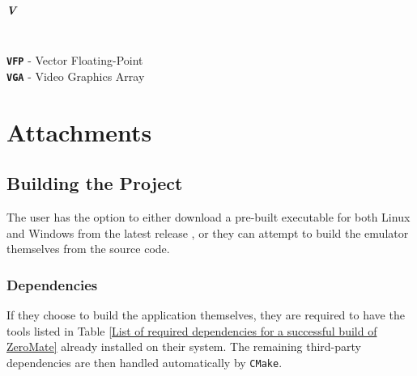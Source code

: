 \documentclass[english, ing, kiv, he, iso690numb, pdf]{fasthesis}
\newcommand\mainmatterWithoutReset
{
	\edef\temppagenumber{\arabic{page}}%
	\mainmatter
	\setcounter{page}{\the\numexpr\temppagenumber+2\relax}%
}
\begin{document}
	\paragraph{V}
	\\
	\noindent
	\textbf{\texttt{VFP}} - Vector Floating-Point \\
	\textbf{\texttt{VGA}} - Video Graphics Array \\
	
	\listoffigures
	\listoftables
	\listoflistings
	
	\mainmatterWithoutReset
	
	\chapter{Attachments}
	
	\section{Building the Project}
	
	The user has the option to either download a pre-built executable for both Linux and Windows from the latest release \cite{ZeroMate}, or they can attempt to build the emulator themselves from the source code.
	
	\subsection{Dependencies}
	
	If they choose to build the application themselves, they are required to have the tools listed in Table \ref{List of required dependencies for a successful build of ZeroMate} already installed on their system. The remaining third-party dependencies are then handled automatically by \texttt{CMake}.
	
\end{document}
